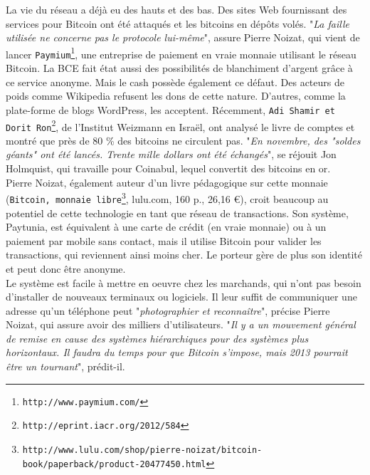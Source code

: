 \documentclass[11pt,twoside,a4paper]{article}
\begin{document}
La vie du r{\'e}seau a d{\'e}j{\`a} eu des hauts et des bas. Des sites Web fournissant des services pour Bitcoin ont {\'e}t{\'e} attaqu{\'e}s et les bitcoins en d{\'e}p{\^o}ts vol{\'e}s. "\emph{La faille utilis{\'e}e ne concerne pas le protocole lui-m{\^e}me}", assure Pierre Noizat, qui vient de lancer \texttt{Paymium\footnote{\texttt{http://www.paymium.com/}}}, une entreprise de paiement en vraie monnaie utilisant le r{\'e}seau Bitcoin. La BCE fait {\'e}tat aussi des possibilit{\'e}s de blanchiment d'argent gr{\^a}ce {\`a} ce service anonyme. Mais le cash poss{\`e}de {\'e}galement ce d{\'e}faut. Des acteurs de poids comme Wikipedia refusent les dons de cette nature. D'autres, comme la plate-forme de blogs WordPress, les acceptent. R{\'e}cemment, \texttt{Adi Shamir et Dorit Ron\footnote{\texttt{http://eprint.iacr.org/2012/584}}}, de l'Institut Weizmann en Isra{\"e}l, ont analys{\'e} le livre de comptes et montr{\'e} que pr{\`e}s de 80 \% des bitcoins ne circulent pas. "\emph{En novembre, des "soldes g{\'e}ants" ont {\'e}t{\'e} lanc{\'e}s. Trente mille dollars ont {\'e}t{\'e} {\'e}chang{\'e}s}", se r{\'e}jouit Jon Holmquist, qui travaille pour Coinabul, lequel convertit des bitcoins en or. ~\\

Pierre Noizat, {\'e}galement auteur d'un livre p{\'e}dagogique sur cette monnaie (\texttt{Bitcoin, monnaie libre\footnote{\texttt{http://www.lulu.com/shop/pierre-noizat/bitcoin-book/paperback/product-20477450.html}}}, lulu.com, 160 p., 26,16 \euro ), croit beaucoup au potentiel de cette technologie en tant que r{\'e}seau de transactions. Son syst{\`e}me, Paytunia, est {\'e}quivalent {\`a} une carte de cr{\'e}dit (en vraie monnaie) ou {\`a} un paiement par mobile sans contact, mais il utilise Bitcoin pour valider les transactions, qui reviennent ainsi moins cher. Le porteur g{\`e}re de plus son identit{\'e} et peut donc {\^e}tre anonyme. ~\\

Le syst{\`e}me est facile {\`a} mettre en oeuvre chez les marchands, qui n'ont pas besoin d'installer de nouveaux terminaux ou logiciels. Il leur suffit de communiquer une adresse qu'un t{\'e}l{\'e}phone peut "\emph{photographier et reconna{\^i}tre}", pr{\'e}cise Pierre Noizat, qui assure avoir des milliers d'utilisateurs. "\emph{Il y a un mouvement g{\'e}n{\'e}ral de remise en cause des syst{\`e}mes hi{\'e}rarchiques pour des syst{\`e}mes plus horizontaux. Il faudra du temps pour que Bitcoin s'impose, mais 2013 pourrait {\^e}tre un tournant}", pr{\'e}dit-il. ~\\
\end{document}
